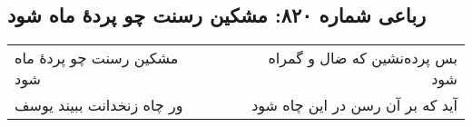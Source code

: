 \begin{center}
\section*{رباعی شماره ۸۲۰: مشکین رسنت چو پردهٔ ماه شود}
\label{sec:0820}
\begin{longtable}{l p{0.5cm} r}
مشکین رسنت چو پردهٔ ماه شود
&&
بس پرده‌نشین که ضال و گمراه شود
\\
ور چاه زنخدانت ببیند یوسف
&&
آید که بر آن رسن در این چاه شود
\\
\end{longtable}
\end{center}
